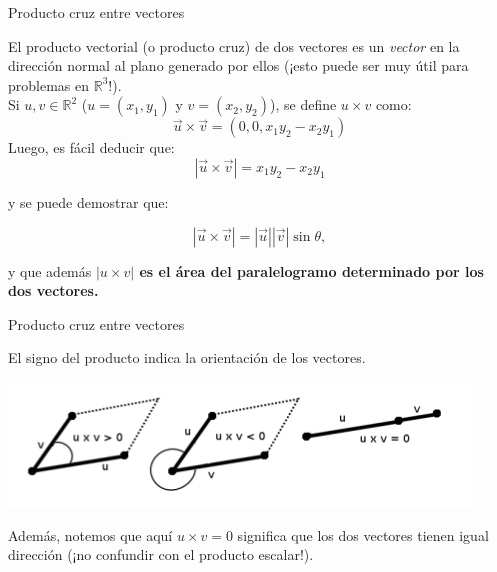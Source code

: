 \documentclass[compress]{beamer}
\newcommand{\be}{\begin{equation*}}
\newcommand{\ee}{\end{equation*}}
\begin{document}
\begin{frame}{Producto cruz entre vectores}

El producto vectorial (o producto cruz) de dos vectores es un \emph{vector} en la direcci\'on normal al plano generado por ellos (¡esto puede ser muy \'util para problemas en $\mathbb{R}^3$!). \\

Si $u,v \in \mathbb{R}^2$ ($u = (x_1,y_1)$ y $v = (x_2,y_2)$), se define $u \times v$ como:
\be
   \vec{u} \times \vec{v} = (0, 0, x_1 y_2 - x_2 y_1)
\ee
Luego, es fácil deducir que:
\be
   |\vec{u} \times \vec{v}| = x_1 y_2 - x_2 y_1
\ee

y se puede demostrar que:

\be
    |\vec{u} \times \vec{v}| = |\vec{u}| |\vec{v}| \sin\theta,
\ee

y que adem\'as \textbf{ $|u \times v|$ es el \'area del paralelogramo determinado por los dos vectores.}
\end{frame}


\begin{frame}{Producto cruz entre vectores}

El signo del producto indica la orientaci\'on de los vectores.
%
\begin{center}
\includegraphics[scale=0.6]{images/producto_cruz.png}
\end{center}
%

Adem\'as, notemos que aqu\'i $u \times v = 0$ significa que los dos vectores tienen igual direcci\'on (¡no confundir con el producto escalar!). \\

\end{frame}
\end{document}
